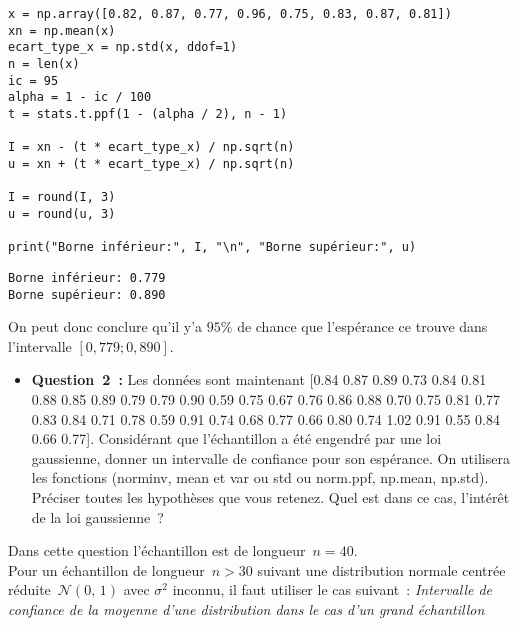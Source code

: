 \vspace{.2cm}


\begin{lstlisting}[style=myPython, caption=Code Python question 1, frame=lines]
x = np.array([0.82, 0.87, 0.77, 0.96, 0.75, 0.83, 0.87, 0.81])
xn = np.mean(x)
ecart_type_x = np.std(x, ddof=1)
n = len(x)
ic = 95
alpha = 1 - ic / 100
t = stats.t.ppf(1 - (alpha / 2), n - 1)

I = xn - (t * ecart_type_x) / np.sqrt(n)
u = xn + (t * ecart_type_x) / np.sqrt(n)

I = round(I, 3)
u = round(u, 3)

print("Borne inférieur:", I, "\n", "Borne supérieur:", u)
\end{lstlisting}

\begin{lstlisting}[style=myLog, caption=Résultat du code, frame=lines]
Borne inférieur: 0.779 
Borne supérieur: 0.890
\end{lstlisting}

\noindent
On peut donc conclure qu'il y'a $95\%$ de chance que l'espérance ce trouve dans l'intervalle $[0,779; 0,890]$.

\vspace{.5cm}

\clearpage

\begin{itemize}[label={},itemindent=-2em,leftmargin=2em]
    \item \textbf{Question~2~:} Les données sont maintenant [0.84 0.87 0.89 0.73 0.84 0.81 0.88 0.85 0.89 0.79 0.79 0.90
    0.59 0.75 0.67 0.76 0.86 0.88 0.70 0.75 0.81 0.77 0.83 0.84 0.71 0.78 0.59 0.91 0.74 0.68 0.77 0.66
    0.80 0.74 1.02 0.91 0.55 0.84 0.66 0.77]. Considérant que l’échantillon a été engendré par une
    loi gaussienne, donner un intervalle de confiance pour son espérance. On utilisera les fonctions
    (norminv, mean et var ou std ou norm.ppf, np.mean, np.std). Préciser toutes les hypothèses que
    vous retenez. Quel est dans ce cas, l’intérêt de la loi gaussienne~?
\end{itemize}
\vspace{.2cm}

\noindent
Dans cette question l'échantillon est de longueur~$n=40$. \\
Pour un échantillon de longueur~$n>30$ suivant une distribution normale centrée réduite~$\mathcal{N}(0,\,1)$ avec $\sigma^{2}$ inconnu, il faut utiliser le cas suivant~: 
\textit{Intervalle de confiance de la moyenne d’une distribution dans le cas d’un grand échantillon} \\

